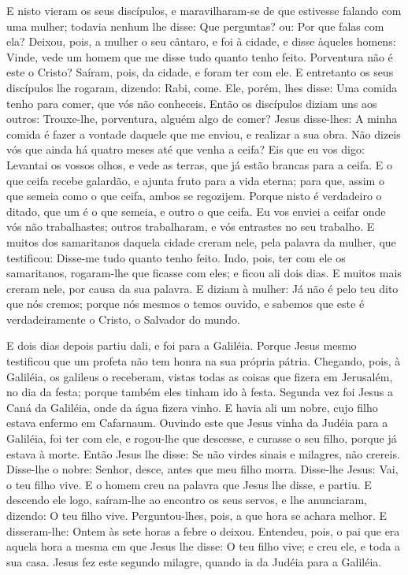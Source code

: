 E nisto vieram os seus discípulos, e maravilharam-se de que
estivesse falando com uma mulher; todavia nenhum lhe disse: Que
perguntas? ou: Por que falas com ela? Deixou, pois, a mulher
o seu cântaro, e foi à cidade, e disse àqueles homens: Vinde,
vede um homem que me disse tudo quanto tenho feito. Porventura não é
este o Cristo? Saíram, pois, da cidade, e foram ter com ele.
E entretanto os seus discípulos lhe rogaram, dizendo: Rabi,
come. Ele, porém, lhes disse: Uma comida tenho para comer,
que vós não conheceis. Então os discípulos diziam uns aos
outros: Trouxe-lhe, porventura, alguém algo de comer? Jesus
disse-lhes: A minha comida é fazer a vontade daquele que me enviou,
e realizar a sua obra. Não dizeis vós que ainda há quatro
meses até que venha a ceifa? Eis que eu vos digo: Levantai os vossos
olhos, e vede as terras, que já estão brancas para a ceifa. E
o que ceifa recebe galardão, e ajunta fruto para a vida eterna; para
que, assim o que semeia como o que ceifa, ambos se regozijem.
Porque nisto é verdadeiro o ditado, que um é o que semeia, e
outro o que ceifa. Eu vos enviei a ceifar onde vós não
trabalhastes; outros trabalharam, e vós entrastes no seu trabalho.
E muitos dos samaritanos daquela cidade creram nele, pela
palavra da mulher, que testificou: Disse-me tudo quanto tenho feito.
Indo, pois, ter com ele os samaritanos, rogaram-lhe que
ficasse com eles; e ficou ali dois dias. E muitos mais creram
nele, por causa da sua palavra. E diziam à mulher: Já não é
pelo teu dito que nós cremos; porque nós mesmos o temos ouvido, e
sabemos que este é verdadeiramente o Cristo, o Salvador do mundo.

E dois dias depois partiu dali, e foi para a Galiléia.
Porque Jesus mesmo testificou que um profeta não tem honra na
sua própria pátria. Chegando, pois, à Galiléia, os galileus o
receberam, vistas todas as coisas que fizera em Jerusalém, no dia da
festa; porque também eles tinham ido à festa. Segunda vez foi
Jesus a Caná da Galiléia, onde da água fizera vinho. E havia ali um
nobre, cujo filho estava enfermo em Cafarnaum. Ouvindo este
que Jesus vinha da Judéia para a Galiléia, foi ter com ele, e
rogou-lhe que descesse, e curasse o seu filho, porque já estava à
morte. Então Jesus lhe disse: Se não virdes sinais e
milagres, não crereis. Disse-lhe o nobre: Senhor, desce,
antes que meu filho morra. Disse-lhe Jesus: Vai, o teu filho
vive. E o homem creu na palavra que Jesus lhe disse, e partiu.
E descendo ele logo, saíram-lhe ao encontro os seus servos, e
lhe anunciaram, dizendo: O teu filho vive. Perguntou-lhes,
pois, a que hora se achara melhor. E disseram-lhe: Ontem às sete
horas a febre o deixou. Entendeu, pois, o pai que era aquela
hora a mesma em que Jesus lhe disse: O teu filho vive; e creu ele, e
toda a sua casa. Jesus fez este segundo milagre, quando ia da
Judéia para a Galiléia.

